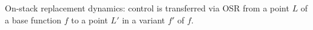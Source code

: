 \label{fig:osr-dynamics} On-stack replacement dynamics: control is transferred via OSR from a point $L$ of a base function $f$ to a point $L'$ in a variant $f'$ of $f$.
  
  
  
  
  